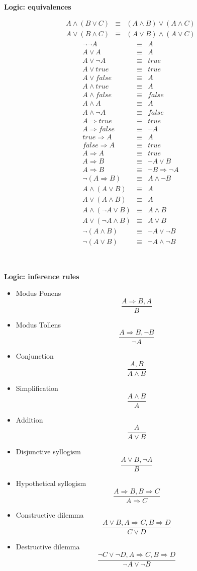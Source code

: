 \documentclass{article}
\newcommand{\bi}{\begin{itemize}}
\newcommand{\ii}{\item}
\newcommand{\ei}{\end{itemize}}
\newcommand{\ti}[1]{
\mbox{~}

\vspace{1.25in}
\centerline{\bf #1}}
\begin{document}
\newpage

\ti{Logic: equivalences}
\LARGE
\newcommand{\eq}{&\equiv&}
\newcommand{\imp}{\Rightarrow}

\begin{multicols}{2}
\begin{eqnarray*}
A\land(B\lor C) \eq  (A\land B) \lor (A \land C)\\
A\lor(B\land C) \eq  (A\lor B) \land (A \lor C)
\end{eqnarray*}
\begin{eqnarray*}
\neg \neg A \eq A\\
A\lor A \eq A\\
A\lor \neg A \eq true\\
A\lor true \eq true\\
A\lor false \eq A\\
A\land true \eq A\\
A\land false \eq false\\
A\land A \eq A\\
A\land \neg A \eq false\\
A\imp true \eq true\\
A\imp false \eq \neg A\\
true\imp A \eq A\\
false \imp A \eq true\\
A\imp A \eq true\\
A\imp B \eq \neg A \lor B\\
A\imp B \eq \neg B \imp \neg A\\
\neg(A\imp B) \eq A \land \neg B\\
A\land(A\lor B) \eq A\\
A\lor(A\land B) \eq A\\
A\land(\neg A \lor B) \eq A \land B\\
A \lor (\neg A \land B) \eq A \lor B\\
\neg(A\land B) \eq \neg A \lor \neg B\\
\neg(A\lor B) \eq \neg A \land \neg B
\end{eqnarray*}

\end{multicols}
\huge

\newpage
\ti{Logic: inference rules}
\begin{multicols}{2}
\bi
\ii Modus Ponens
\[
\frac{A\imp B, A}{B}
\]
\ii Modus Tollens
\[
\frac{A\imp B, \neg B}{\neg A}
\]
\ii Conjunction
\[
\frac{A,B}{A\land B}
\]
\ii Simplification
\[
\frac{A\land B}{A}
\]
\ii Addition
\[
\frac{A}{A\lor B}
\]
\ii Disjunctive syllogism
\[
\frac{A\lor B, \neg A}{B}
\]
\ii Hypothetical syllogism
\[
\frac{A\imp B, B\imp C}{A\imp C}
\]
\ii Constructive dilemma
\[
\frac{A\lor B, A\imp C, B\imp D}{C\lor D}
\]
\ii Destructive dilemma
\[
\frac{\neg C\lor \neg D, A\imp C, B\imp D}{\neg A \lor \neg B}
\]
\ei
\end{multicols}
\end{document}
